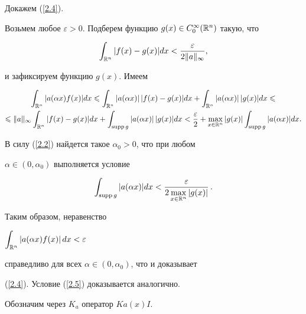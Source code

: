 \begin{pf}


Докажем (\ref{2.4}). 


Возьмем любое $\varepsilon>0$. Подберем функцию $g(x)\in


C_0^\infty(\Bbb R^n)$ такую, что


$$


\int_{\Bbb R^n} |f(x)-g(x)|dx<


\frac{\varepsilon}{2\|a\|_\infty},


$$


и зафиксируем функцию $g(x)$. Имеем


\begin{multline*}


\int_{\Bbb R^n} |a(\alpha x)f(x)|dx\leqslant


\int_{\Bbb R^n} |a(\alpha x)|\,|f(x)-g(x)|dx+


\int_{\Bbb R^n} |a(\alpha x)|\,|g(x)|dx\leqslant\\


%


\leqslant \|a\|_\infty \int_{\Bbb R^n} |f(x)-g(x)|dx+


\int_{\supp g}|a(\alpha x)|\,|g(x)|dx<


\frac{\varepsilon}{2}+\max_{x\in\Bbb R^n}|g(x)|


\int_{\supp g}|a(\alpha x)|dx.


\end{multline*}


В силу (\ref{2.2}) найдется такое $\alpha_0>0$, что при любом


$\alpha\in(0,\alpha_0)$ выполняется условие


$$


\int_{\supp g}|a(\alpha x)|dx<


\frac{\varepsilon}{2\max\limits_{x\in\Bbb R^n}|g(x)|}\,.


$$


Таким образом, неравенство


$\displaystyle\int_{\Bbb R^n}|a(\alpha x)f(x)|\,dx<\varepsilon$


справедливо для всех $\alpha\in(0,\alpha_0)$, что и доказывает


(\ref{2.4}). Условие (\ref{2.5}) доказывается аналогично.


\end{pf}





Обозначим через $K_a$ оператор $Ka(x)I$.





